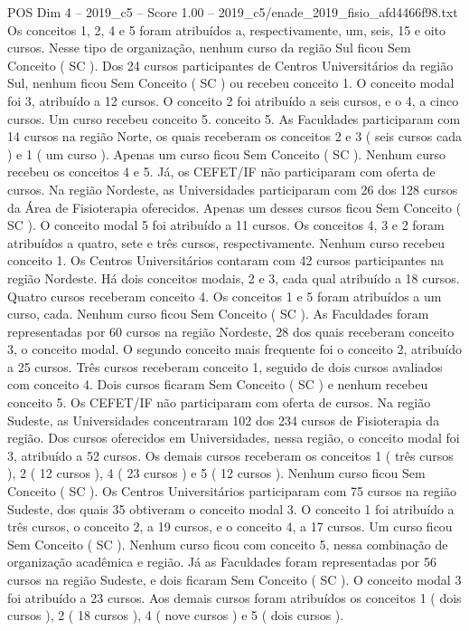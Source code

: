 \begin{textsample}{POS Dim 4 – 2019\_c5 – Score 1.00 – 2019\_c5/enade\_2019\_fisio\_afd4466f98.txt}
Os conceitos 1, 2, 4 e 5 foram atribuídos a, respectivamente, um, seis, 15 e oito cursos.
Nesse tipo de organização, nenhum curso da região Sul ficou Sem Conceito ( SC ).
Dos 24 cursos participantes de Centros Universitários da região Sul, nenhum ficou Sem Conceito ( SC ) ou recebeu conceito 1.
O conceito modal foi 3, atribuído a 12 cursos.
O conceito 2 foi atribuído a seis cursos, e o 4, a cinco cursos.
Um curso recebeu conceito 5. conceito 5.
As Faculdades participaram com 14 cursos na região Norte, os quais receberam os conceitos 2 e 3 ( seis cursos cada ) e 1 ( um curso ).
Apenas um curso ficou Sem Conceito ( SC ).
Nenhum curso recebeu os conceitos 4 e 5.
Já, os CEFET/IF não participaram com oferta de cursos.
Na região Nordeste, as Universidades participaram com 26 dos 128 cursos da Área de Fisioterapia oferecidos.
Apenas um desses cursos ficou Sem Conceito ( SC ).
O conceito modal 5 foi atribuído a 11 cursos.
Os conceitos 4, 3 e 2 foram atribuídos a quatro, sete e três cursos, respectivamente.
Nenhum curso recebeu conceito 1.
Os Centros Universitários contaram com 42 cursos participantes na região Nordeste.
Há dois conceitos modais, 2 e 3, cada qual atribuído a 18 cursos.
Quatro cursos receberam conceito 4.
Os conceitos 1 e 5 foram atribuídos a um curso, cada.
Nenhum curso ficou Sem Conceito ( SC ).
As Faculdades foram representadas por 60 cursos na região Nordeste, 28 dos quais receberam conceito 3, o conceito modal.
O segundo conceito mais frequente foi o conceito 2, atribuído a 25 cursos.
Três cursos receberam conceito 1, seguido de dois cursos avaliados com conceito 4.
Dois cursos ficaram Sem Conceito ( SC ) e nenhum recebeu conceito 5.
Os CEFET/IF não participaram com oferta de cursos.
Na região Sudeste, as Universidades concentraram 102 dos 234 cursos de Fisioterapia da região.
Dos cursos oferecidos em Universidades, nessa região, o conceito modal foi 3, atribuído a 52 cursos.
Os demais cursos receberam os conceitos 1 ( três cursos ), 2 ( 12 cursos ), 4 ( 23 cursos ) e 5 ( 12 cursos ).
Nenhum curso ficou Sem Conceito ( SC ).
Os Centros Universitários participaram com 75 cursos na região Sudeste, dos quais 35 obtiveram o conceito modal 3.
O conceito 1 foi atribuído a três cursos, o conceito 2, a 19 cursos, e o conceito 4, a 17 cursos.
Um curso ficou Sem Conceito ( SC ).
Nenhum curso ficou com conceito 5, nessa combinação de organização acadêmica e região.
Já as Faculdades foram representadas por 56 cursos na região Sudeste, e dois ficaram Sem Conceito ( SC ).
O conceito modal 3 foi atribuído a 23 cursos.
Aos demais cursos foram atribuídos os conceitos 1 ( dois cursos ), 2 ( 18 cursos ), 4 ( nove cursos ) e 5 ( dois cursos ).

\end{textsample}
